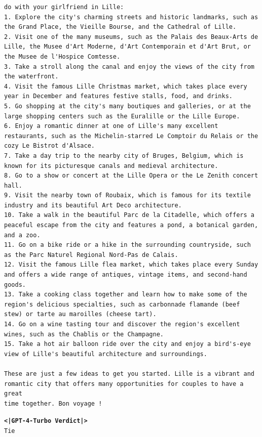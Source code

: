 \documentclass{article}
\begin{document}
\begin{tcolorbox}
\begin{lstlisting}
do with your girlfriend in Lille:
1. Explore the city's charming streets and historic landmarks, such as the Grand Place, the Vieille Bourse, and the Cathedral of Lille.
2. Visit one of the many museums, such as the Palais des Beaux-Arts de Lille, the Musee d'Art Moderne, d'Art Contemporain et d'Art Brut, or the Musee de l'Hospice Comtesse.
3. Take a stroll along the canal and enjoy the views of the city from the waterfront.
4. Visit the famous Lille Christmas market, which takes place every year in December and features festive stalls, food, and drinks.
5. Go shopping at the city's many boutiques and galleries, or at the large shopping centers such as the Euralille or the Lille Europe.
6. Enjoy a romantic dinner at one of Lille's many excellent restaurants, such as the Michelin-starred Le Comptoir du Relais or the cozy Le Bistrot d'Alsace.
7. Take a day trip to the nearby city of Bruges, Belgium, which is known for its picturesque canals and medieval architecture.
8. Go to a show or concert at the Lille Opera or the Le Zenith concert hall.
9. Visit the nearby town of Roubaix, which is famous for its textile industry and its beautiful Art Deco architecture.
10. Take a walk in the beautiful Parc de la Citadelle, which offers a peaceful escape from the city and features a pond, a botanical garden, and a zoo.
11. Go on a bike ride or a hike in the surrounding countryside, such as the Parc Naturel Regional Nord-Pas de Calais.
12. Visit the famous Lille flea market, which takes place every Sunday and offers a wide range of antiques, vintage items, and second-hand goods.
13. Take a cooking class together and learn how to make some of the region's delicious specialties, such as carbonnade flamande (beef stew) or tarte au maroilles (cheese tart).
14. Go on a wine tasting tour and discover the region's excellent wines, such as the Chablis or the Champagne.
15. Take a hot air balloon ride over the city and enjoy a bird's-eye view of Lille's beautiful architecture and surroundings.

These are just a few ideas to get you started. Lille is a vibrant and 
romantic city that offers many opportunities for couples to have a great 
time together. Bon voyage !
\end{lstlisting}

\texttt{\textbf{<|GPT-4-Turbo Verdict|>} \\
Tie}
\end{tcolorbox}
\end{document}
